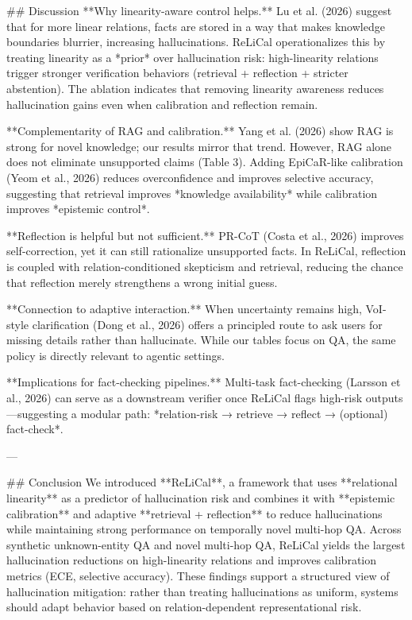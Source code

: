 ## Discussion  
**Why linearity-aware control helps.** Lu et al. (2026) suggest that for more linear relations, facts are stored in a way that makes knowledge boundaries blurrier, increasing hallucinations. ReLiCal operationalizes this by treating linearity as a *prior* over hallucination risk: high-linearity relations trigger stronger verification behaviors (retrieval + reflection + stricter abstention). The ablation indicates that removing linearity awareness reduces hallucination gains even when calibration and reflection remain.

**Complementarity of RAG and calibration.** Yang et al. (2026) show RAG is strong for novel knowledge; our results mirror that trend. However, RAG alone does not eliminate unsupported claims (Table 3). Adding EpiCaR-like calibration (Yeom et al., 2026) reduces overconfidence and improves selective accuracy, suggesting that retrieval improves *knowledge availability* while calibration improves *epistemic control*.

**Reflection is helpful but not sufficient.** PR-CoT (Costa et al., 2026) improves self-correction, yet it can still rationalize unsupported facts. In ReLiCal, reflection is coupled with relation-conditioned skepticism and retrieval, reducing the chance that reflection merely strengthens a wrong initial guess.

**Connection to adaptive interaction.** When uncertainty remains high, VoI-style clarification (Dong et al., 2026) offers a principled route to ask users for missing details rather than hallucinate. While our tables focus on QA, the same policy is directly relevant to agentic settings.

**Implications for fact-checking pipelines.** Multi-task fact-checking (Larsson et al., 2026) can serve as a downstream verifier once ReLiCal flags high-risk outputs—suggesting a modular path: *relation-risk → retrieve → reflect → (optional) fact-check*.

---

## Conclusion  
We introduced **ReLiCal**, a framework that uses **relational linearity** as a predictor of hallucination risk and combines it with **epistemic calibration** and adaptive **retrieval + reflection** to reduce hallucinations while maintaining strong performance on temporally novel multi-hop QA. Across synthetic unknown-entity QA and novel multi-hop QA, ReLiCal yields the largest hallucination reductions on high-linearity relations and improves calibration metrics (ECE, selective accuracy). These findings support a structured view of hallucination mitigation: rather than treating hallucinations as uniform, systems should adapt behavior based on relation-dependent representational risk.

